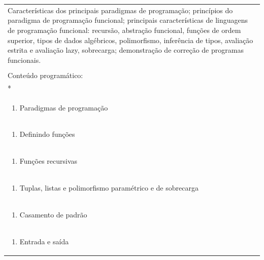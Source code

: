 \documentclass[11pt]{article}
\begin{document}
\begin{center}
\begin{longtable}{|p{4cm}|p{4cm}|p{4cm}|p{4cm}|}
\multicolumn{4}{|p{\dimexpr 16cm + 6\tabcolsep\relax}|}{Características dos principais paradigmas de programação; princípios do paradigma de programação funcional; principais características de linguagens de programação funcional: recursão, abstração funcional, funções de ordem superior, tipos de dados algébricos, polimorfismo, inferência de tipos, avaliação estrita e avaliação lazy, sobrecarga; demonstração de correção de programas funcionais.}\\
\multicolumn{4}{|p{16cm}|}{}\\
\hline
\multicolumn{4}{|p{16cm}|}{Conteúdo programático:}\\*
\multicolumn{4}{|p{\dimexpr 16cm + 6\tabcolsep\relax}|}{\begin{enumerate}[start=1]\item Introdução\end{enumerate}}\\
\multicolumn{4}{|p{\dimexpr 16cm + 6\tabcolsep\relax}|}{\begin{enumerate}[start=2]\item Paradigmas de programação\end{enumerate}}\\
\multicolumn{4}{|p{\dimexpr 16cm + 6\tabcolsep\relax}|}{\begin{enumerate}[start=3]\item Definindo funções\end{enumerate}}\\
\multicolumn{4}{|p{\dimexpr 16cm + 6\tabcolsep\relax}|}{\begin{enumerate}[start=4]\item Funções recursivas\end{enumerate}}\\
\multicolumn{4}{|p{\dimexpr 16cm + 6\tabcolsep\relax}|}{\begin{enumerate}[start=5]\item Tuplas, listas e polimorfismo paramétrico e de sobrecarga\end{enumerate}}\\
\multicolumn{4}{|p{\dimexpr 16cm + 6\tabcolsep\relax}|}{\begin{enumerate}[start=6]\item Casamento de padrão\end{enumerate}}\\
\multicolumn{4}{|p{\dimexpr 16cm + 6\tabcolsep\relax}|}{\begin{enumerate}[start=7]\item Entrada e saída\end{enumerate}}\\

\end{longtable}
\end{center}
\end{document}

